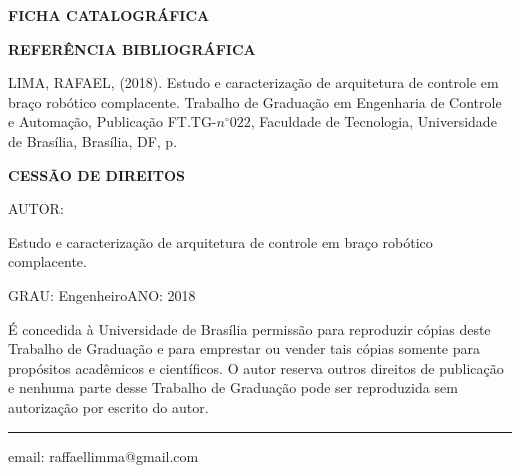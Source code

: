 \noindent \textbf{FICHA CATALOGRÁFICA}

\noindent %

\noindent \medskip{}


\noindent \textbf{REFERÊNCIA BIBLIOGRÁFICA}

LIMA, RAFAEL, (2018). Estudo e caracterização de arquitetura de controle em braço robótico complacente. Trabalho de Graduação
em Engenharia de Controle e Automação, Publicação FT.TG-$n^{\circ}022$,
Faculdade de Tecnologia, Universidade de Brasília, Brasília, DF, \pageref{LastPage}p.

\noindent \bigskip{}


\noindent \textbf{CESSÃO DE DIREITOS}

\noindent AUTOR: \autorinome

Estudo e caracterização de arquitetura de controle em braço robótico complacente.

\noindent \medskip{}


\noindent GRAU: Engenheiro\hfill{}ANO: 2018\hfill{}

\noindent \medskip{}


É concedida à Universidade de Brasília permissão para reproduzir cópias
deste Trabalho de Graduação e para emprestar ou vender tais cópias
somente para propósitos acadêmicos e científicos. O autor reserva
outros direitos de publicação e nenhuma parte desse Trabalho de Graduação
pode ser reproduzida sem autorização por escrito do autor.

\noindent \bigskip{}


\noindent \rule[0.5ex]{1\columnwidth}{1pt}

\noindent \autorinome

email: raffaellimma@gmail.com

